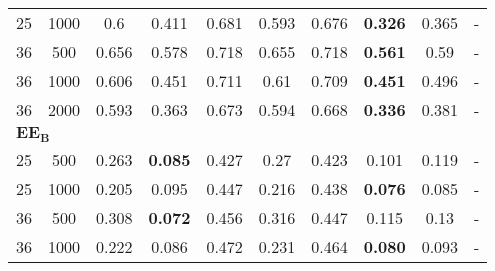 \begin{landscape}
\begin{table}[!h]
\begin{tabular}{cccccccccc}
	 25  & 1000 &          0.6          &                 0.411                 &                      0.681                       &                     0.593                      &                      0.676                       & \textbf{0.326}           &           0.365            & -                 \\
	 36  & 500  &         0.656         &                 0.578                 &                      0.718                       &                     0.655                      &                      0.718                       & \textbf{0.561}           &            0.59            & -                 \\
	 36  & 1000 &         0.606         &                 0.451                 &                      0.711                       &                      0.61                      &                      0.709                       & \textbf{0.451}           &           0.496            & -                 \\
	 36  & 2000 &         0.593         &                 0.363                 &                      0.673                       &                     0.594                      &                      0.668                       & \textbf{0.336}           &           0.381            & -                 \\
	\hline
	\multicolumn{10}{l}{$\mathbf{EE_B}$} \\
	\hline
	 25  & 500  &         0.263         & \textbf{0.085}                        &                      0.427                       &                      0.27                      &                      0.423                       & 0.101                    &           0.119            & -                 \\
	 25  & 1000 &         0.205         & 0.095                                 &                      0.447                       &                     0.216                      &                      0.438                       & \textbf{0.076}           &           0.085            & -                 \\
	 36  & 500  &         0.308         & \textbf{0.072}                        &                      0.456                       &                     0.316                      &                      0.447                       & 0.115                    &            0.13            & -                 \\
	 36  & 1000 &         0.222         & 0.086                                 &                      0.472                       &                     0.231                      &                      0.464                       & \textbf{0.080}           &           0.093            & -                 \\

\end{tabular}
\end{table}
\end{landscape}
